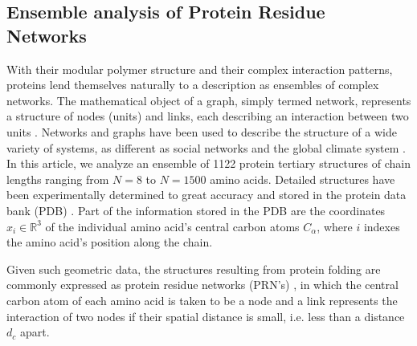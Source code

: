 \documentclass[9pt]{elife}
\begin{document}
\subsection{Ensemble analysis of Protein Residue Networks} 
With their modular polymer structure and their complex interaction patterns, proteins lend themselves naturally to a description as ensembles of complex networks. The mathematical object of a graph, simply termed network, represents a structure of nodes (units) and links, each describing an interaction between two units \cite{Albert2002,boccaletti2006complex,newman2003structure}. Networks and graphs have been used to describe the structure of a wide variety of systems, as different as social networks \cite{watts1998collective,girvan2002community} and the global climate system \cite{donges2009complex,molkenthin2014networks}.
In this article, we analyze an ensemble of 1122 
protein tertiary structures of chain lengths ranging from $N=8$ to $N=1500$ amino acids. Detailed structures have been experimentally determined to great accuracy and stored in the protein data bank (PDB) \cite{PDB}. 
Part of the information stored in the PDB are the coordinates $x_i\in\mathbb{R}^3
$ of the individual amino acid's central carbon atoms $C_\alpha$, where $i$ indexes the amino acid's position along the chain. 

Given such geometric data, the structures resulting from protein folding are commonly expressed as protein residue networks (PRN's) \cite{Dokholyan2002,Vendruscolo2002,DiPaola2013,Estrada2011}, in which the central carbon atom of each amino acid is taken to be a node and a link represents the interaction of two nodes if their spatial distance is small, i.e. less than a distance $d_c$ apart. 
\end{document}

